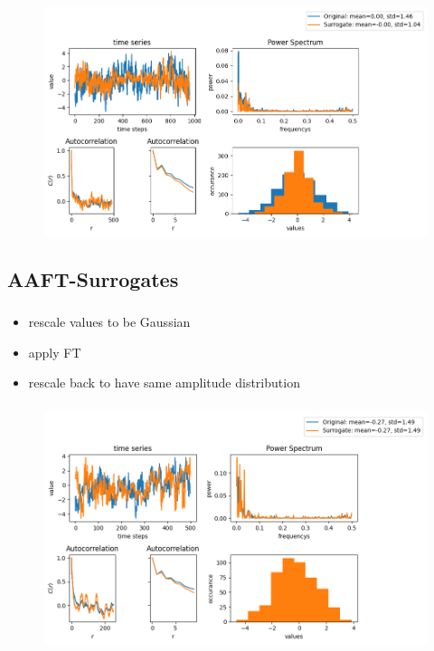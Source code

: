 \begin{frame}
  \frametitle{\insertsectionhead}
  \framesubtitle{\insertsubsectionhead}
\begin{figure}
  \centering
  \includegraphics[height=0.8\textheight]{figs/FT.png}
\end{figure}
\end{frame}

\subsection{AAFT-Surrogates}
\begin{frame}
  \frametitle{\insertsectionhead}
  \framesubtitle{\insertsubsectionhead}
  \begin{itemize}
    \item rescale values to be Gaussian
    \item apply FT 
    \item rescale back to have same amplitude distribution
  \end{itemize}
\end{frame}

\begin{frame}
  \frametitle{\insertsectionhead}
  \framesubtitle{\insertsubsectionhead}
\begin{figure}
  \centering
  \includegraphics[height=0.8\textheight]{figs/AAFT.png}
\end{figure}
\end{frame}

